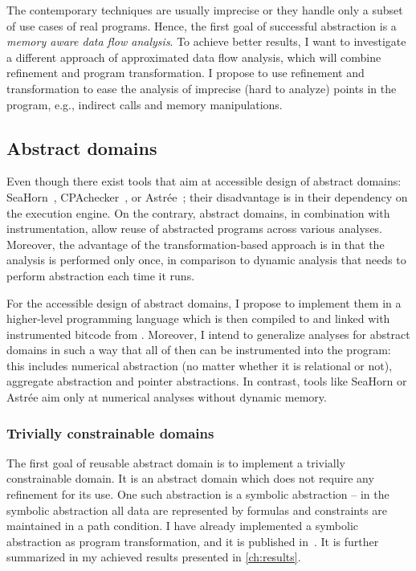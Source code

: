 The contemporary techniques are usually imprecise or they handle only a subset of use
cases of real programs. Hence, the first goal of successful abstraction is a
\emph{memory aware data flow analysis}. To achieve better results, I want to
investigate a different approach of approximated data flow analysis, which will
combine refinement and program transformation. I propose to use refinement
and transformation to ease the analysis of imprecise (hard to analyze) points
in the program, e.g., indirect calls and memory manipulations.

\subsection{Abstract domains}

Even though there exist tools that aim at accessible design of abstract
domains: SeaHorn~\cite{Gurfinkel2015}, CPAchecker~\cite{Beyer2013}, or
Astrée~\cite{Astree}; their disadvantage is in their dependency on the
execution engine.  On the contrary, abstract domains, in combination with \lart
instrumentation, allow reuse of abstracted programs across various analyses.
Moreover, the advantage of the transformation-based approach is in that the
analysis is performed only once, in comparison to dynamic analysis that needs
to perform abstraction each time it runs.

For the accessible design of abstract domains, I propose to implement them in a
higher-level programming language which is then compiled to
\llvm and linked with instrumented bitcode from \lart.  Moreover, I intend to
generalize analyses for abstract domains in such a way that all of then can be
instrumented into the program: this includes numerical abstraction (no matter
whether it is relational or not), aggregate abstraction and pointer
abstractions. In contrast, tools like SeaHorn or Astrée aim only at numerical
analyses without dynamic memory.

\subsubsection{Trivially constrainable domains}

The first goal of reusable abstract domain is to implement a trivially constrainable
domain. It is an abstract domain which does not require any refinement for its
use. One such abstraction is a symbolic abstraction -- in the symbolic
abstraction all data are represented by formulas and constraints are maintained
in a path condition. I have already implemented a symbolic abstraction as
program transformation, and it is published in~\cite{Lauko2018SymComp}.
It is further summarized in my achieved results presented in \autoref{ch:results}.

